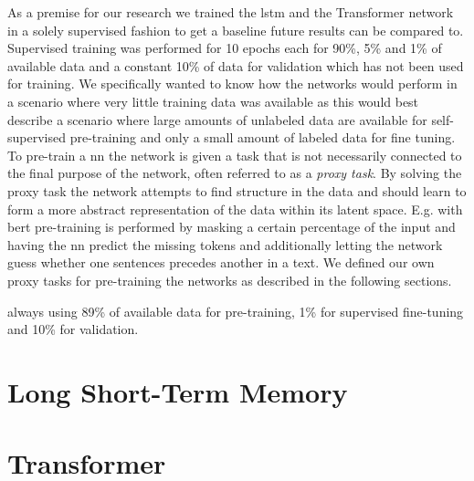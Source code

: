 As a premise for our research we trained the \gls{lstm} and the Transformer network in a solely supervised fashion to get a baseline future results can be compared to. Supervised training was performed for 10 epochs each for 90\%, 5\% and 1\% of available data and a constant 10\% of data for validation which has not been used for training. We specifically wanted to know how the networks would perform in a scenario where very little training data was available as this would best describe a scenario where large amounts of unlabeled data are available for self-supervised pre-training and only a small amount of labeled data for fine tuning. To pre-train a \gls{nn} the network is given a task that is not necessarily connected to the final purpose of the network, often referred to as a \textit{proxy task}. By solving the proxy task the network attempts to find structure in the data and should learn to form a more abstract representation of the data within its latent space. E.g. with \gls{bert} pre-training is performed by masking a certain percentage of the input and having the \gls{nn} predict the missing tokens and additionally letting the network guess whether one sentences precedes another in a text. We defined our own proxy tasks for pre-training the networks as described in the following sections.




always using 89\% of available data for pre-training, 1\% for supervised fine-tuning and 10\% for validation.


\section{Long Short-Term Memory} \label{sect.experiments_lstm}

\section{Transformer} \label{sect.experiments_transformer}

\newpage
